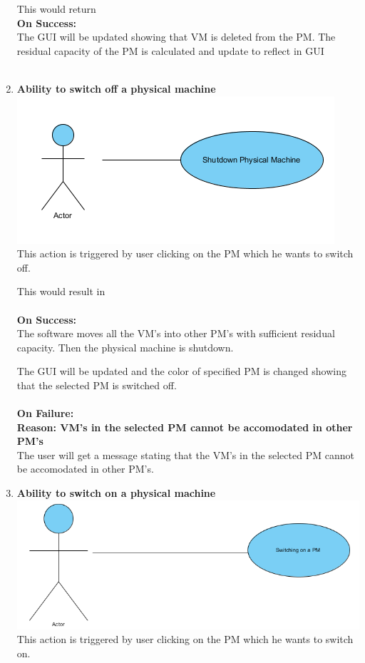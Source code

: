 \documentclass[a4paper,11pt]{article}
\begin{document}
\begin{enumerate}
				This would return \\
				{\bf On Success: }\\
				The GUI will be updated showing that VM  is deleted from the PM.
				The residual capacity of the PM is calculated and update to reflect in GUI\\\\
				
				\item {\bf Ability to switch off a physical machine}\\
				\includegraphics{images/shut}
				\\This action is triggered by user clicking on the PM which he wants to switch off. 
								
				This would result in \\\\
				{\bf On Success: }\\
				The software moves all the VM's into other PM's with sufficient residual capacity. Then the physical machine is shutdown.
			
				The GUI will be updated and the color of specified PM is changed showing that the selected PM is switched off.
				\\\\
				{\bf On Failure: } \\
				{\bf Reason: VM's in the selected PM cannot be accomodated in other PM's}\\
				The user will get a message stating that the VM's in the selected PM cannot be accomodated in other PM's.
				
				\item {\bf Ability to switch on a physical machine}\\
				\includegraphics[scale=0.7]{images/onpm}
				\\This action is triggered by user clicking on the PM which he wants to switch on. 
				

\end{enumerate}
\end{document}
